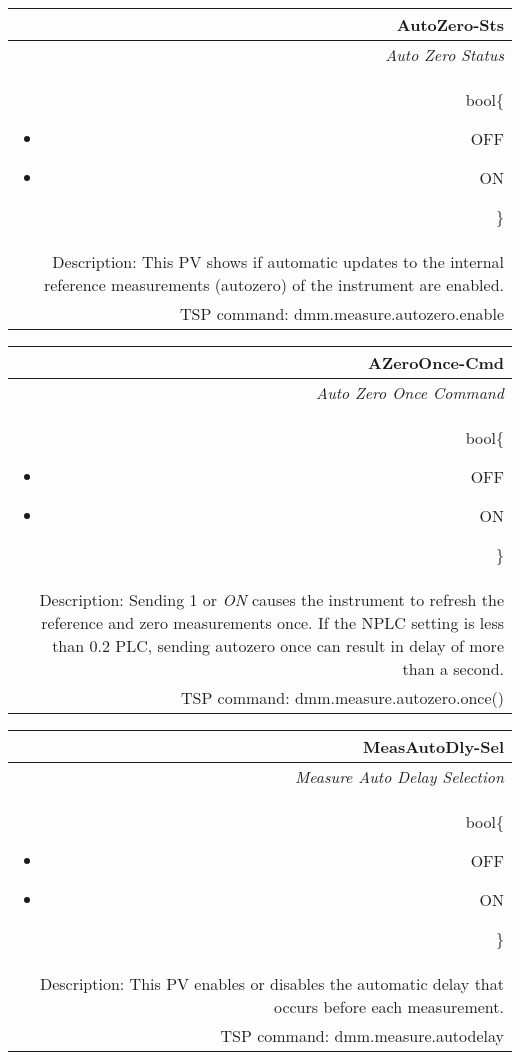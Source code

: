 \documentclass[openany]{article}
\begin{document}
		\begin{tabular}{N}
			\hline
			\bfseries AutoZero-Sts\label{pv:autozero-sts} \\ \hline
			\emph{Auto Zero Status} \\
			bool\{\begin{itemize}[noitemsep]
				\small
				\item[] OFF
				\item[] ON
			\end{itemize}\} \\
			Description: This PV shows if automatic updates to the internal reference measurements (autozero) of the instrument are enabled. \\
			TSP command: dmm.measure.autozero.enable
		\end{tabular}

		\begin{tabular}{N}
			\hline
			\bfseries AZeroOnce-Cmd\label{pv:azeroonce-cmd} \\ \hline
			\emph{Auto Zero Once Command} \\
			bool\{\begin{itemize}[noitemsep]
				\small
				\item[] OFF
				\item[] ON
			\end{itemize}\} \\
			Description: Sending 1 or \emph{ON} causes the instrument to refresh the reference and zero measurements once. If the NPLC setting is less than 0.2 PLC, sending autozero once can result in delay of more than a second. \\
			TSP command: dmm.measure.autozero.once()
		\end{tabular}

		\begin{tabular}{N}
			\hline
			\bfseries MeasAutoDly-Sel\label{pv:measautodly-sel} \\ \hline
			\emph{Measure Auto Delay Selection} \\
			bool\{\begin{itemize}[noitemsep]
				\small
				\item[] OFF
				\item[] ON
			\end{itemize}\} \\
			Description: This PV enables or disables the automatic delay that occurs before each measurement. \\
			TSP command: dmm.measure.autodelay
		\end{tabular}
\end{document}
